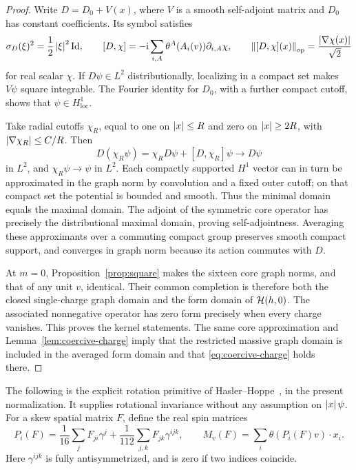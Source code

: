 \begin{proof}
Write \(D=D_0+V(x)\), where \(V\) is a smooth self-adjoint matrix
and \(D_0\) has constant coefficients. Its symbol satisfies
\begin{equation}
\label{alg:symbol}
 \sigma_D(\xi)^2=\frac12\left\lvert \xi\right\rvert^2\mathrm{Id},
 \qquad
 [D,\chi]=-\mathrm i\sum_{i,A}\theta^A(A_i(v))\partial_{i,A}\chi,
 \qquad
 \left\lVert [D,\chi](x)\right\rVert_{\mathrm{op}}=\frac{\left\lvert \nabla\chi(x)\right\rvert}{\sqrt2}
\end{equation}
for real scalar \(\chi\). If \(D\psi\in L^2\) distributionally,
localizing in a compact set makes \(V\psi\) square integrable. The
Fourier identity for \(D_0\), with a further compact cutoff, shows
that \(\psi\in H^1_{\mathrm{loc}}\).

Take radial cutoffs \(\chi_R\), equal to one on \(\left\lvert x\right\rvert\leq R\)
and zero on \(\left\lvert x\right\rvert\geq2R\), with
\(\left\lvert \nabla\chi_R\right\rvert\leq C/R\). Then
\[
 D(\chi_R\psi)=\chi_RD\psi+[D,\chi_R]\psi
 \longrightarrow D\psi
\]
in \(L^2\), and \(\chi_R\psi\to\psi\) in \(L^2\). Each compactly
supported \(H^1\) vector can in turn be approximated in the graph
norm by convolution and a fixed outer cutoff; on that compact set
the potential is bounded and smooth. Thus the minimal domain equals
the maximal domain. The adjoint of the symmetric core operator has
precisely the distributional maximal domain, proving
self-adjointness. Averaging these approximants over a commuting
compact group preserves smooth compact support, and converges in
graph norm because its action commutes with \(D\).

At \(m=0\), Proposition~\ref{prop:square} makes the sixteen core
graph norms, and that of any unit \(v\), identical. Their common
completion is therefore both the closed single-charge graph domain
and the form domain of \(\mathcal H(h,0)\). The associated nonnegative
operator has zero form precisely when every charge vanishes. This
proves the kernel statements. The same core approximation and
Lemma~\ref{lem:coercive-charge} imply that the restricted massive
graph domain is included in the averaged form domain and that
\eqref{eq:coercive-charge} holds there.
\end{proof}

The following is the explicit rotation primitive of
Hasler--Hoppe~\cite[Lemma~2(c)]{HaslerHoppe2002}, in the present
normalization. It supplies rotational invariance without any
assumption on \(\left\lvert x\right\rvert\psi\). For a skew spatial matrix \(F\),
define the real spin matrices
\begin{equation}
\label{alg:explicit-P}
 P_i(F)=\frac1{16}\sum_jF_{ji}\gamma^j
        +\frac1{112}\sum_{j,k}F_{jk}\gamma^{ijk},
 \qquad
 M_v(F)=\sum_i\theta(P_i(F)v)\cdot x_i.
\end{equation}
Here \(\gamma^{ijk}\) is fully antisymmetrized, and is zero if two
indices coincide.

